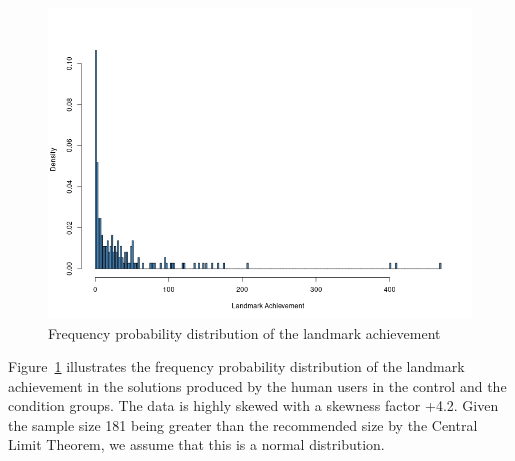 \begin{figure}[tpb]
  \centering
\includegraphics[width=\columnwidth]{img/histo_ach.png}
  \caption{Frequency probability distribution of the landmark achievement}
  \label{fig:histach}
\end{figure}
Figure~\ref{fig:histach} illustrates the frequency probability distribution of the landmark achievement in the solutions produced by the human users in the control and the condition groups. 
The data is highly skewed with a skewness factor +4.2.
Given the sample size 181 being greater than the recommended size by the Central Limit Theorem, we assume that this is a normal distribution.


%

